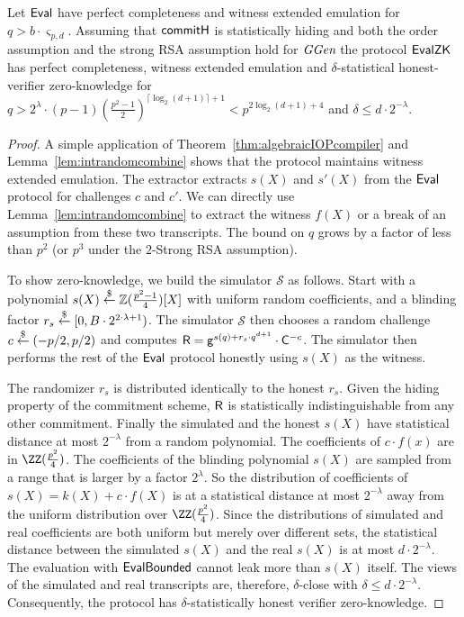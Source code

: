 \begin{theorem}
Let $\textsf{{Eval}}$ have perfect completeness and witness extended emulation for $q> b\cdot \boldsymbol{\varsigma}_{p, d}$. Assuming that $\textsf{{commitH}}$ is statistically hiding and both the order assumption and the strong RSA assumption hold for $\textit{GGen}$ the protocol $\textsf{{EvalZK}}$ has perfect completeness, witness extended emulation and $\delta$-statistical honest-verifier zero-knowledge for $q>2^\lambda\cdot (p-1)(\frac{p^2-1}{2})^{\lceil \log_2(d+1)\rceil+1}<p^{2\log_2(d+1)+4}$ and $\delta \leq d \cdot 2^{-\lambda}$.
\end{theorem}

\begin{proof}
A simple application of Theorem~\ref{thm:algebraicIOPcompiler} and Lemma~\ref{lem:intrandomcombine} shows that the protocol maintains witness extended emulation. The extractor extracts $s(X)$ and $s'(X)$ from the $\textsf{{Eval}}$ protocol for challenges $c$ and $c'$. We can directly use Lemma~\ref{lem:intrandomcombine} to extract the witness $f(X)$ or a break of an assumption from these two transcripts. The bound on $q$ grows by a factor of less than $p^2$ (or $p^3$ under the $2$-Strong RSA assumption).   

To show zero-knowledge, we build the simulator $\mathcal{S}$ as follows. Start with a polynomial $s(X) \overset{\$}{\gets} \mathbb{Z}(\frac{p^2-1}{4})[X]$ with uniform random coefficients, and a blinding factor $r_s \overset{\$}{\gets} [0,B\cdot 2^{2\cdot\lambda+1})$. The simulator $\mathcal{S}$ then chooses a random challenge $c \overset{\$}{\gets} (-p/2,p/2)$ and computes $\mathsf{R} = \mathsf{g}^{s(q) + r_s \cdot q^{d+1}} \cdot \mathsf{C}^{-c}$. The simulator then performs the rest of the $\textsf{{Eval}}$ protocol honestly using $s(X)$ as the witness. 

The randomizer $r_s$ is distributed identically to the honest $r_s$. Given the hiding property of the commitment scheme, $\mathsf{R}$ is statistically indistinguishable from any other commitment. Finally the simulated and the honest $s(X)$ have statistical distance at most $2^{-\lambda}$ from a random polynomial. The coefficients of $c\cdot f(x)$ are in $\ZZ(\frac{p^2}{4})$. The coefficients of the blinding polynomial $s(X)$ are sampled from a range that is larger by a factor $2^{\lambda}$. So the distribution of coefficients of $s(X) = k(X) + c \cdot f(X)$ is at a statistical distance at most $2^{-\lambda}$ away from the uniform distribution over $\ZZ(\frac{p^2}{4})$. Since the distributions of simulated and real coefficients are both uniform but merely over different sets, the statistical distance between the simulated $s(X)$ and the real $s(X)$ is at most $d \cdot 2^{-\lambda}$. The evaluation with $\textsf{{EvalBounded}}$ cannot leak more than $s(X)$ itself. The views of the simulated and real transcripts are, therefore, $\delta$-close with $\delta \leq d \cdot 2^{-\lambda}$. Consequently, the protocol has $\delta$-statistically honest verifier zero-knowledge.
\end{proof}